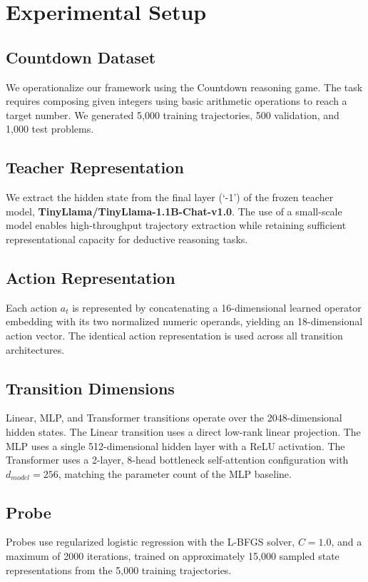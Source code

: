 \documentclass[conference]{IEEEtran}
\begin{document}
\section{Experimental Setup}

\subsection{Countdown Dataset}
We operationalize our framework using the Countdown reasoning game. The task requires composing given integers using basic arithmetic operations to reach a target number. We generated 5,000 training trajectories, 500 validation, and 1,000 test problems.

\subsection{Teacher Representation}
We extract the hidden state from the final layer (`-1') of the frozen teacher model, \textbf{TinyLlama/TinyLlama-1.1B-Chat-v1.0}. The use of a small-scale model enables high-throughput trajectory extraction while retaining sufficient representational capacity for deductive reasoning tasks.

\subsection{Action Representation}
Each action $a_t$ is represented by concatenating a 16-dimensional learned operator embedding with its two normalized numeric operands, yielding an 18-dimensional action vector. The identical action representation is used across all transition architectures.

\subsection{Transition Dimensions}
Linear, MLP, and Transformer transitions operate over the 2048-dimensional hidden states. The Linear transition uses a direct low-rank linear projection. The MLP uses a single 512-dimensional hidden layer with a ReLU activation. The Transformer uses a 2-layer, 8-head bottleneck self-attention configuration with $d_{model}=256$, matching the parameter count of the MLP baseline.

\subsection{Probe}
Probes use regularized logistic regression with the L-BFGS solver, $C=1.0$, and a maximum of 2000 iterations, trained on approximately 15,000 sampled state representations from the 5,000 training trajectories.
\end{document}
